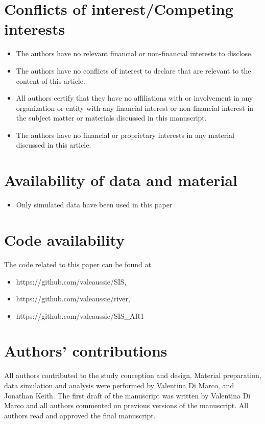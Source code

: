 \documentclass[11pt,a4paper]{article}
\begin{document}
\section*{Conflicts of interest/Competing interests}
\begin{itemize}
    \item The authors have no relevant financial or non-financial interests to disclose.
    \item The authors have no conflicts of interest to declare that are relevant to the content of this article.
    \item All authors certify that they have no affiliations with or involvement in any organization or entity with any financial interest or non-financial interest in the subject matter or materials discussed in this manuscript.
    \item The authors have no financial or proprietary interests in any material discussed in this article.
\end{itemize}

\section*{Availability of data and material}
\begin{itemize}
    \item Only simulated data have been used in this paper
\end{itemize}

\section*{Code availability}
The code related to this paper can be found at 
\begin{itemize}
    \item https://github.com/valeaussie/SIS, 
    \item https://github.com/valeaussie/river, 
    \item https://github.com/valeaussie/SIS\_AR1
\end{itemize}

\section*{Authors' contributions }
All authors contributed to the study conception and design. Material preparation, data simulation and analysis were performed by Valentina Di Marco, and Jonathan Keith. The first draft of the manuscript was written by Valentina Di Marco and all authors commented on previous versions of the manuscript. All authors read and approved the final manuscript.
\end{document}
